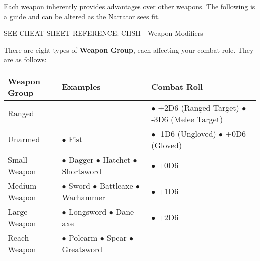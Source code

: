 Each weapon inherently provides advantages over other weapons. The following is a guide and can be altered as the Narrator sees fit.

SEE CHEAT SHEET REFERENCE: CHSH - Weapon Modifiers

There are eight types of \textbf{Weapon Group}, each affecting your combat role. They are as follows:

\begin{center}
    \begin{xltabular}{\textwidth}{|l X X|} 
        \hline 
        \textbf{Weapon Group} & \textbf{Examples} & \textbf{Combat Roll}\\ 
        \hline
        Ranged & & 
                $\bullet$ +2D6 (Ranged Target) \newline
                $\bullet$ -3D6 (Melee Target) \vspace{1em} \\
        Unarmed & 
            $\bullet$ Fist \vspace{1em} & 
                $\bullet$ -1D6 (Ungloved) \newline
                $\bullet$ +0D6 (Gloved) \vspace{1em} \\
        Small Weapon & 
            $\bullet$ Dagger \newline
            $\bullet$ Hatchet \newline
            $\bullet$ Shortsword \vspace{1em} & 
                $\bullet$ +0D6 \vspace{1em} \\
        Medium Weapon & 
            $\bullet$ Sword  \newline
            $\bullet$ Battleaxe \newline
            $\bullet$ Warhammer \vspace{1em} & 
                $\bullet$ +1D6 \vspace{1em} \\
        Large Weapon & 
            $\bullet$ Longsword \newline
            $\bullet$ Dane axe \vspace{1em} &
                $\bullet$ +2D6 \vspace{1em} \\
        Reach Weapon & 
            $\bullet$ Polearm \newline
            $\bullet$ Spear \newline
            $\bullet$ Greatsword \vspace{1em} &

\end{xltabular}
\end{center}
